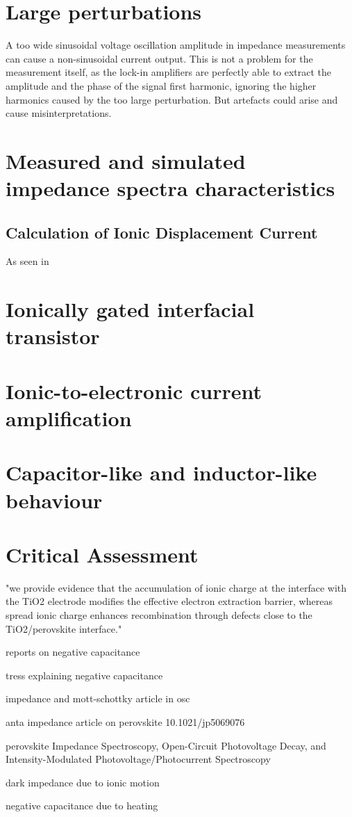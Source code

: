 \section{Large perturbations}\label{impedance-large_perturbations}

A too wide sinusoidal voltage oscillation amplitude in impedance measurements can cause a non-sinusoidal current output.
This is not a problem for the measurement itself, as the lock-in amplifiers are perfectly able to extract the amplitude and the phase of the signal first harmonic, ignoring the higher harmonics caused by the too large perturbation.
But artefacts could arise and cause misinterpretations.


\section{Measured and simulated impedance spectra characteristics}

\subsection{Calculation of Ionic Displacement Current}\label{displacement_current_ionic}
As seen in 



\section{Ionically gated interfacial transistor}


\section{Ionic-to-electronic current amplification}
\section{Capacitor-like and inductor-like behaviour}
\section{Critical Assessment}

"we provide evidence that the accumulation of ionic charge at the interface with the TiO2 electrode modifies the effective electron extraction barrier, whereas spread ionic charge enhances recombination through defects close to the TiO2/perovskite interface." \cite{Tress2016}

reports on negative capacitance \cite{Sanchez2014}

tress explaining negative capacitance \cite{Ebadi2019}

impedance and mott-schottky article in osc \cite{Brus2016}

anta impedance article on perovskite 10.1021/jp5069076

perovskite Impedance Spectroscopy, Open-Circuit Photovoltage Decay, and Intensity-Modulated Photovoltage/Photocurrent Spectroscopy \cite{Pockett2015}

dark impedance due to ionic motion \cite{Yang2015e}

negative capacitance due to heating \cite{Knapp2015}